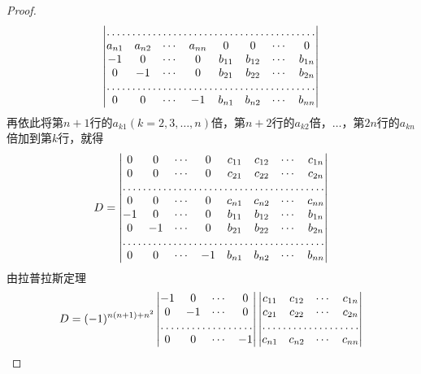 \documentclass[twoside,openright]{book}
\begin{document}
\begin{CJK*}{UTF8}{}
\begin{proof}
\[\begin{vmatrix}
                   \hdotsfor{8} \\
                a_{n1} & a_{n2} & \cdots & a_{nn}  & 0 & 0 & \cdots & 0 \\
                 -1 & 0 & \cdots & 0 & b_{11} & b_{12} & \cdots & b_{1n} \\
                 0 & -1 & \cdots & 0 & b_{21} & b_{22} & \cdots & b_{2n} \\
                   \hdotsfor{8} \\
                 0 & 0 & \cdots & -1 & b_{n1} & b_{n2} & \cdots & b_{nn} \end{vmatrix}
\]
再依此将第$n+1$行的$a_{k1}(k=2,3,\dotsc,n)$倍，第$n+2$行的$a_{k2}$倍，$\dotsc$，第$2n$行的$a_{kn}$倍加到第$k$行，就得
\[
D=\begin{vmatrix} 0 & 0 & \cdots & 0  & c_{11} & c_{12} & \cdots & c_{1n}\\
                0 & 0 & \cdots & 0  & c_{21} & c_{22} & \cdots & c_{2n} \\
                   \hdotsfor{8} \\
                0 & 0 & \cdots & 0  & c_{n1} & c_{n2} & \cdots & c_{nn} \\
                 -1 & 0 & \cdots & 0 & b_{11} & b_{12} & \cdots & b_{1n} \\
                 0 & -1 & \cdots & 0 & b_{21} & b_{22} & \cdots & b_{2n} \\
                   \hdotsfor{8} \\
                 0 & 0 & \cdots & -1 & b_{n1} & b_{n2} & \cdots & b_{nn} \end{vmatrix}
\]
由拉普拉斯定理
\begin{align*}
D&=(-1)^{n(n+1)+n^2}\begin{vmatrix} -1 & 0 & \cdots & 0\\
                   0 & -1 & \cdots & 0 \\
                   \hdotsfor{4} \\
                   0 & 0 & \cdots & -1 \\
                 \end{vmatrix}\begin{vmatrix}  c_{11} & c_{12} & \cdots & c_{1n}\\
                   c_{21} & c_{22} & \cdots & c_{2n} \\
                   \hdotsfor{4} \\
                   c_{n1} & c_{n2} & \cdots & c_{nn} \\
                 \end{vmatrix} \\

\end{align*}
\end{proof}
\end{CJK*}
\end{document}
